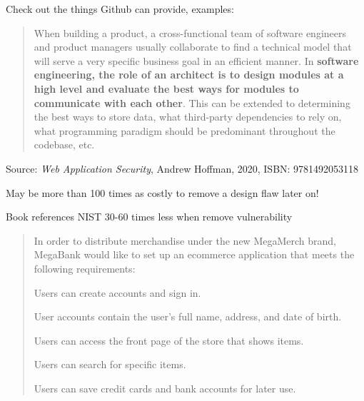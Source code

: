 \documentclass[Screen16to9,17pt]{foils}
\begin{document}
Check out the things Github can provide, examples:
\begin{list2}
\item {}
\item {}
\item {}
\item {}
\end{list2}






\begin{quote}
When building a product, a cross-functional team of software engineers and product managers usually collaborate to find a technical model that will serve a very specific business goal in an efficient manner. In {\bf software engineering, the role of an architect is to design modules at a high level and evaluate the best ways for modules to communicate with each other}. This can be extended to determining the best ways to store data, what third-party dependencies to rely on, what programming paradigm should be predominant throughout the codebase, etc.
\end{quote}
Source: \emph{Web Application Security}, Andrew Hoffman, 2020, ISBN: 9781492053118

\begin{list2}
\item May be more than 100 times as costly to remove a design flaw later on!
\item Book references NIST 30-60 times less when remove vulnerability
\end{list2}



\begin{quote}

In order to distribute merchandise under the new MegaMerch brand, MegaBank
would like to set up an ecommerce application that meets the following requirements:
\begin{list2}
\item Users can create accounts and sign in.
\item User accounts contain the user’s full name, address, and date of birth.
\item Users can access the front page of the store that shows items.
\item Users can search for specific items.
\item Users can save credit cards and bank accounts for later use.
\end{list2}
\end{quote}
\end{document}
